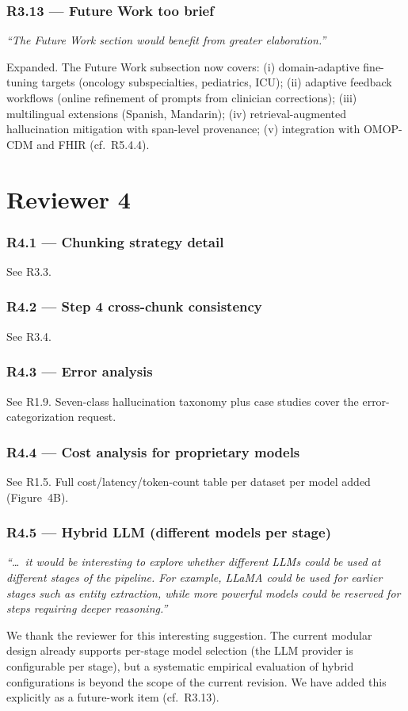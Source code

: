 \documentclass[11pt,letterpaper]{article}
\newcommand{\reviewer}[1]{\par\medskip\textcolor{blue!75!black}{\textit{#1}}\par\medskip}
\newcommand{\response}[1]{\par#1\par\medskip}
\begin{document}
\subsubsection*{R3.13 --- Future Work too brief}
\reviewer{``The Future Work section would benefit from greater elaboration.''}
\response{Expanded. The Future Work subsection now covers: (i) domain-adaptive fine-tuning targets (oncology subspecialties, pediatrics, ICU); (ii) adaptive feedback workflows (online refinement of prompts from clinician corrections); (iii) multilingual extensions (Spanish, Mandarin); (iv) retrieval-augmented hallucination mitigation with span-level provenance; (v) integration with OMOP-CDM and FHIR (cf.\ R5.4.4).}

\hrulefill

\section{Reviewer 4}

\subsubsection*{R4.1 --- Chunking strategy detail}
\response{See R3.3.}

\subsubsection*{R4.2 --- Step 4 cross-chunk consistency}
\response{See R3.4.}

\subsubsection*{R4.3 --- Error analysis}
\response{See R1.9. Seven-class hallucination taxonomy plus case studies cover the error-categorization request.}

\subsubsection*{R4.4 --- Cost analysis for proprietary models}
\response{See R1.5. Full cost/latency/token-count table per dataset per model added (Figure~4B).}

\subsubsection*{R4.5 --- Hybrid LLM (different models per stage)}
\reviewer{``\dots\ it would be interesting to explore whether different LLMs could be used at different stages of the pipeline. For example, LLaMA could be used for earlier stages such as entity extraction, while more powerful models could be reserved for steps requiring deeper reasoning.''}
\response{We thank the reviewer for this interesting suggestion. The current modular design already supports per-stage model selection (the LLM provider is configurable per stage), but a systematic empirical evaluation of hybrid configurations is beyond the scope of the current revision. We have added this explicitly as a future-work item (cf.\ R3.13).}
\end{document}
